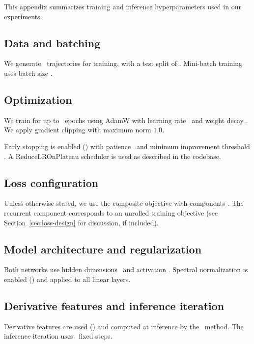 This appendix summarizes training and inference hyperparameters used in our experiments.

\subsection{Data and batching}
We generate \HPNumSamples\ trajectories for training, with a test split of \HPTestSplit.
Mini-batch training uses batch size \HPBatchSize.

\subsection{Optimization}
We train for up to \HPEpochs\ epochs using AdamW with learning rate \HPLR\ and weight decay \HPWeightDecay.
We apply gradient clipping with maximum norm $1.0$.

Early stopping is enabled (\HPEarlyStop) with patience \HPEarlyPat\ and minimum improvement threshold \HPEarlyDelta.
A ReduceLROnPlateau scheduler is used as described in the codebase.

\subsection{Loss configuration}
Unless otherwise stated, we use the composite objective with components \HPLossCfg.
The recurrent component corresponds to an unrolled training objective (see Section~\ref{sec:loss-design} for discussion, if included).

\subsection{Model architecture and regularization}
Both networks use hidden dimensions \HPHiddenDims\ and activation \HPAct.
Spectral normalization is enabled (\HPSN) and applied to all linear layers.

\subsection{Derivative features and inference iteration}
Derivative features are used (\HPUseDeriv) and computed at inference by the \HPDerivMethod\ method.
The inference iteration uses \HPIter\ fixed steps.